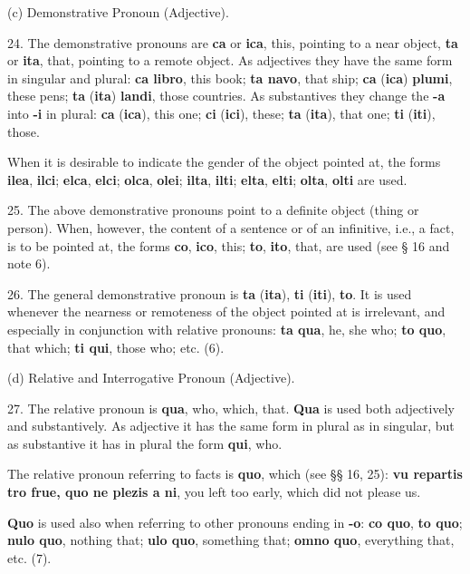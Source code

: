 \Centering (c) Demonstrative Pronoun (Adjective). \\ \justifying

24. The demonstrative pronouns are \textbf{ca} or \textbf{ica}, this, pointing to a near object, \textbf{ta} or \textbf{ita}, that, pointing to a remote object. As adjectives they have the same form in singular and plural: \textbf{ca libro}, this book; \textbf{ta navo}, that ship; \textbf{ca} (\textbf{ica}) \textbf{plumi}, these pens; \textbf{ta} (\textbf{ita}) \textbf{landi}, those countries. As substantives they change the \textbf{-a} into \textbf{-i} in plural: \textbf{ca} (\textbf{ica}), this one; \textbf{ci} (\textbf{ici}), these; \textbf{ta} (\textbf{ita}), that one; \textbf{ti} (\textbf{iti}), those.

When it is desirable to indicate the gender of the object pointed at, the forms \textbf{ilea}, \textbf{ilci}; \textbf{elca}, \textbf{elci}; \textbf{olca}, \textbf{olei}; \textbf{ilta}, \textbf{ilti}; \textbf{elta}, \textbf{elti}; \textbf{olta}, \textbf{olti} are used. 

25. The above demonstrative pronouns point to a definite object (thing or person). When, however, the content of a sentence or of an infinitive, i.e., a fact, is to be pointed at, the forms \textbf{co}, \textbf{ico}, this; \textbf{to}, \textbf{ito}, that, are used (see § 16 and note 6). 

26. The general demonstrative pronoun is \textbf{ta} (\textbf{ita}), \textbf{ti} (\textbf{iti}), \textbf{to}. It is used whenever the nearness or remoteness of the object pointed at is irrelevant, and especially in conjunction with relative pronouns: \textbf{ta qua}, he, she who; \textbf{to quo}, that which; \textbf{ti qui}, those who; etc. (6). 

\Centering (d) Relative and Interrogative Pronoun (Adjective). \\ \justifying

27. The relative pronoun is \textbf{qua}, who, which, that. \textbf{Qua} is used both adjectively and substantively. As adjective it has the same form in plural as in singular, but as substantive it has in plural the form \textbf{qui}, who. 

The relative pronoun referring to facts is \textbf{quo}, which (see §§ 16, 25): \textbf{vu repartis tro frue, quo ne plezis a ni}, you left too early, which did not please us. 

\textbf{Quo} is used also when referring to other pronouns ending in \textbf{-o}: \textbf{co quo}, \textbf{to quo}; \textbf{nulo quo}, nothing that; \textbf{ulo quo}, something that; \textbf{omno quo}, everything that, etc. (7). 

